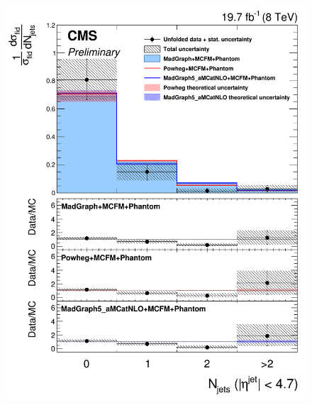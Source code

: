 \begin{figure}[hbtp]
  \begin{center}
    \includegraphics[width=\cmsFigWidth]{Figures/DiffCrossSecZZTo4mJets_Unfolded_fr_MadGraph_norm.png}     

\end{center}
\end{figure}
